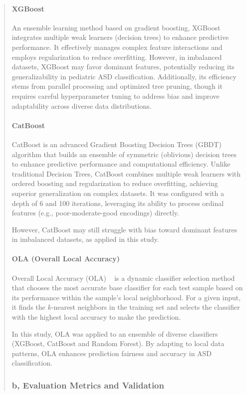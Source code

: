 \documentclass[runningheads]{llncs}
\begin{document}
\begin{abstract}
\paragraph{\textbf{XGBoost}}
An ensemble learning method based on gradient boosting, XGBoost integrates multiple weak learners (decision trees) to enhance predictive performance. It effectively manages complex feature interactions and employs regularization to reduce overfitting. However, in imbalanced datasets, XGBoost may favor dominant features, potentially reducing its generalizability in pediatric ASD classification. Additionally, its efficiency stems from parallel processing and optimized tree pruning, though it requires careful hyperparameter tuning to address bias and improve adaptability across diverse data distributions.
\paragraph{\textbf{CatBoost}}
CatBoost is an advanced Gradient Boosting Decision Trees (GBDT) algorithm that builds an ensemble of symmetric (oblivious) decision trees to enhance predictive performance and computational efficiency.  
Unlike traditional Decision Trees, CatBoost combines multiple weak learners with ordered boosting and regularization to reduce overfitting, achieving superior generalization on complex datasets. It was configured with a depth of 6 and 100 iterations, leveraging its ability to process ordinal features (e.g., poor-moderate-good encodings) directly.

However, CatBoost may still struggle with bias toward dominant features in imbalanced datasets, as applied in this study.

\paragraph{\textbf{OLA (Overall Local Accuracy)~\cite{b18}}}
Overall Local Accuracy (OLA) ~\cite{b19} is a dynamic classifier selection method that chooses the most accurate base classifier for each test sample based on its performance within the sample’s local neighborhood. For a given input, it finds the $k$-nearest neighbors in the training set and selects the classifier with the highest local accuracy to make the prediction.

In this study, OLA was applied to an ensemble of diverse classifiers (XGBoost, CatBoost and Random Forest). By adapting to local data patterns, OLA enhances prediction fairness and accuracy in ASD classification.
\subsubsection{b, Evaluation Metrics and Validation}


\end{abstract}
\end{document}
